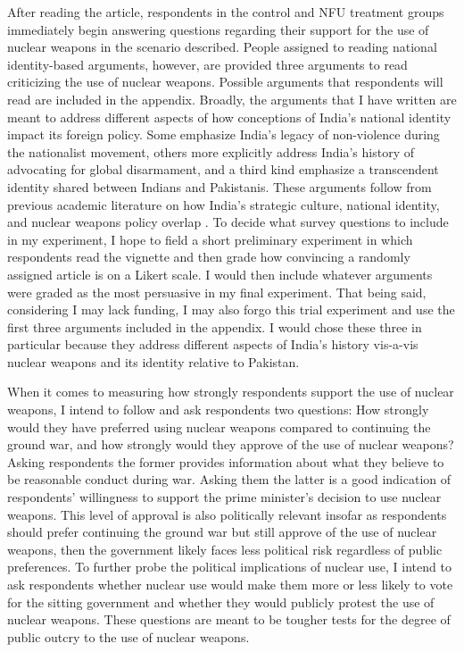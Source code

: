 \documentclass[12pt]{article}
\begin{document}
After reading the article, respondents in the control and NFU treatment groups immediately begin answering questions regarding their support for the use of nuclear weapons in the scenario described. People assigned to reading national identity-based arguments, however, are provided three arguments to read criticizing the use of nuclear weapons. Possible arguments that respondents will read are included in the appendix. Broadly, the arguments that I have written are meant to address different aspects of how conceptions of India's national identity impact its foreign policy. Some emphasize India's legacy of non-violence during the nationalist movement, others more explicitly address India's history of advocating for global disarmament, and a third kind emphasize a transcendent identity shared between Indians and Pakistanis. These arguments follow from previous academic literature on how India's strategic culture, national identity, and nuclear weapons policy overlap \citep{hymans_psychology_2006, bajpai_indian_2014}. To decide what survey questions to include in my experiment, I hope to field a short preliminary experiment in which respondents read the vignette and then grade how convincing a randomly assigned article is on a Likert scale. I would then include whatever arguments were graded as the most persuasive in my final experiment. That being said, considering I may lack funding, I may also forgo this trial experiment and use the first three arguments included in the appendix. I would chose these three in particular because they address different aspects of India's history vis-a-vis nuclear weapons and its identity relative to Pakistan.

When it comes to measuring how strongly respondents support the use of nuclear weapons, I intend to follow \citet{sagan_revisiting_2017} and ask respondents two questions: How strongly would they have preferred using nuclear weapons compared to continuing the ground war, and how strongly would they approve of the use of nuclear weapons? Asking respondents the former provides information about what they believe to be reasonable conduct during war. Asking them the latter is a good indication of respondents' willingness to support the prime minister's decision to use nuclear weapons. This level of approval is also politically relevant insofar as respondents should prefer continuing the ground war but still approve of the use of nuclear weapons, then the government likely faces less political risk regardless of public preferences. To further probe the political implications of nuclear use, I intend to ask respondents whether nuclear use would make them more or less likely to vote for the sitting government and whether they would publicly protest the use of nuclear weapons. These questions are meant to be tougher tests for the degree of public outcry to the use of nuclear weapons. 
\end{document}
